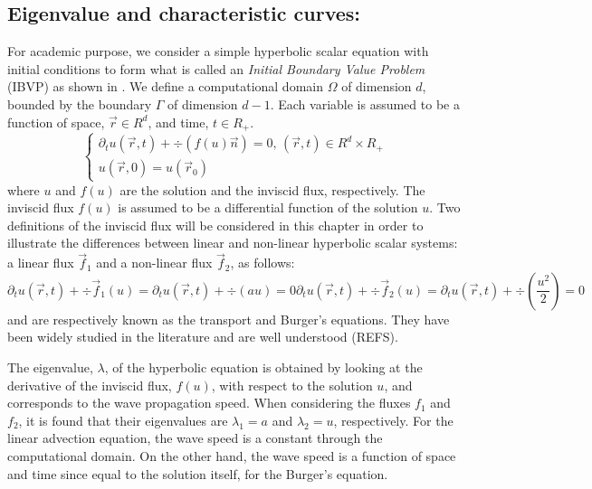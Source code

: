 \subsection{Eigenvalue and characteristic curves:}\label{sec:mat_ppr}
For academic purpose, we consider a simple hyperbolic scalar equation with initial conditions to form what is called an \emph{Initial Boundary Value Problem} (IBVP) as shown in . We define a computational domain $\Omega$ of dimension $d$, bounded by the boundary $\Gamma$ of dimension $d-1$. Each variable is assumed to be a function of space, $\vec{r} \in R^d$, and time, $t \in R_+$.
%
\begin{equation}\label{eq:ivp_sct1b}
\left\{
\begin{array}{l}
\partial_t u(\vec{r},t) + \div ( f(u) \vec{n} ) = 0 \text{, } \left( \vec{r}, t \right) \in R^d \times R_+  \nonumber \\
u(\vec{r},0) = u( \vec{r}_0) 
\end{array}
\right.
\end{equation}
%
where $u$ and $f(u)$ are the solution and the inviscid flux, respectively. The inviscid flux $f(u)$ is assumed to be a differential function of the solution $u$. Two definitions of the inviscid flux will be considered in this chapter in order to illustrate the differences between linear and non-linear hyperbolic scalar systems: a linear flux $\vec{f}_1$ and a non-linear flux $\vec{f}_2$, as follows:
%
\begin{subequations}\label{eq:ivp2_sct1b}
%
\begin{equation}\label{eq:trans_sct1b}
\partial_t u(\vec{r},t) + \div \vec{f}_1(u) = \partial_t u(\vec{r},t) + \div \left( au \right) = 0
\end{equation}
%
\begin{equation}\label{eq:burger_sct1b}
\partial_t u(\vec{r},t) + \div \vec{f}_2(u) = \partial_t u(\vec{r},t) + \div \left( \frac{u^2}{2} \right) = 0
\end{equation}
%
\end{subequations}
%
 and  are respectively known as the transport and Burger's equations. They have been widely studied in the literature and are well understood (REFS). 

The eigenvalue, $\lambda$, of the hyperbolic equation is obtained by looking at the derivative of the inviscid flux, $f(u)$, with respect to the solution $u$, and corresponds to the wave propagation speed. When considering the fluxes $f_1$ and $f_2$, it is found that their eigenvalues are $\lambda_1 = a$ and $\lambda_2 = u$, respectively. For the linear advection equation, the wave speed is a constant through the computational domain. On the other hand, the wave speed is a function of space and time since equal to the solution itself, for the Burger's equation.

